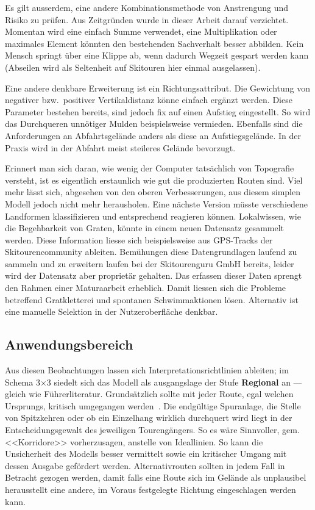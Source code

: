 Es gilt ausserdem, eine andere Kombinationsmethode von Anstrengung und Risiko zu prüfen. Aus Zeitgründen wurde in dieser Arbeit darauf verzichtet. Momentan wird eine einfach Summe verwendet, eine Multiplikation oder maximales Element könnten den bestehenden Sachverhalt besser abbilden. Kein Mensch springt über eine Klippe ab, wenn dadurch Wegzeit gespart werden kann (Abseilen wird als Seltenheit auf Skitouren hier einmal ausgelassen).

Eine andere denkbare Erweiterung ist ein Richtungsattribut. Die Gewichtung von negativer bzw.\ positiver Vertikaldistanz könne einfach ergänzt werden. Diese Parameter bestehen bereits, sind jedoch fix auf einen Aufstieg eingestellt. So wird das Durchqueren unnötiger Mulden beispielsweise vermieden. Ebenfalls sind die Anforderungen an Abfahrtsgelände anders als diese an Aufstiegsgelände. In der Praxis wird in der Abfahrt meist steileres Gelände bevorzugt.

Erinnert man sich daran, wie wenig der Computer tatsächlich von Topografie versteht, ist es eigentlich erstaunlich wie gut die produzierten Routen sind. Viel mehr lässt sich, abgesehen von den oberen Verbesserungen, aus diesem simplen Modell jedoch nicht mehr herausholen. Eine nächste Version müsste verschiedene Landformen klassifizieren und entsprechend reagieren können. Lokalwissen, wie die Begehbarkeit von Graten, könnte in einem neuen Datensatz gesammelt werden. Diese Information liesse sich beispielsweise aus GPS-Tracks der Skitourencommunity ableiten. Bemühungen diese Datengrundlagen laufend zu sammeln und zu erweitern laufen bei der Skitourenguru GmbH bereits, leider wird der Datensatz aber proprietär gehalten. Das erfassen dieser Daten sprengt den Rahmen einer Maturaarbeit erheblich. Damit liessen sich die Probleme betreffend Gratkletterei und spontanen Schwimmaktionen lösen. Alternativ ist eine manuelle Selektion in der Nutzeroberfläche denkbar.

\clearpage
\subsection{Anwendungsbereich}

Aus diesen Beobachtungen lassen sich Interpretationsrichtlinien ableiten;
im Schema 3$\times$3 siedelt sich das Modell als ausgangslage der Stufe \textbf{Regional} an --- gleich wie Führerliteratur. Grundsätzlich sollte mit jeder Route, egal welchen Ursprungs, kritisch umgegangen werden~\cite{sacbergspwinter}. Die endgültige Spuranlage, die Stelle von Spitzkehren oder ob ein Einzelhang wirklich durchquert wird liegt in der Entscheidungsgewalt des jeweiligen Tourengängers. So es wäre Sinnvoller, gem.\ \cite{eisenhuttourknopfdruck} <<Korridore>> vorherzusagen, anstelle von Ideallinien. So kann die Unsicherheit des Modells besser vermittelt sowie ein kritischer Umgang mit dessen Ausgabe gefördert werden. Alternativrouten sollten in jedem Fall in Betracht gezogen werden, damit falls eine Route sich im Gelände als unplausibel herausstellt eine andere, im Voraus festgelegte Richtung eingeschlagen werden kann.

